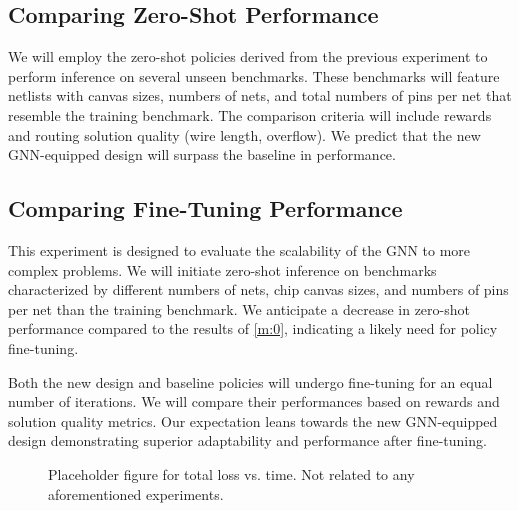 \documentclass[letterpaper]{article}
\begin{document}
\subsection{Comparing Zero-Shot Performance} \label{m:0}
We will employ the zero-shot policies derived from the previous experiment to perform inference on several unseen benchmarks. These benchmarks will feature netlists with canvas sizes, numbers of nets, and total numbers of pins per net that resemble the training benchmark. The comparison criteria will include rewards and routing solution quality (wire length, overflow). We predict that the new GNN-equipped design will surpass the baseline in performance.

\subsection{Comparing Fine-Tuning Performance}
This experiment is designed to evaluate the scalability of the GNN to more complex problems. We will initiate zero-shot inference on benchmarks characterized by different numbers of nets, chip canvas sizes, and numbers of pins per net than the training benchmark. We anticipate a decrease in zero-shot performance compared to the results of \autoref{m:0}, indicating a likely need for policy fine-tuning.

Both the new design and baseline policies will undergo fine-tuning for an equal number of iterations. We will compare their performances based on rewards and solution quality metrics. Our expectation leans towards the new GNN-equipped design demonstrating superior adaptability and performance after fine-tuning.

\begin{figure}[h!]
    \centering
    \caption{Placeholder figure for total loss vs. time. Not related to any aforementioned experiments.}
\end{figure}
\end{document}

